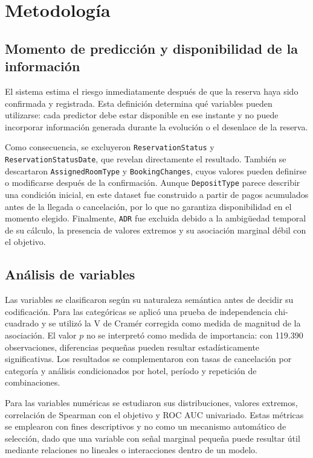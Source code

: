 \section{Metodología}

\subsection{Momento de predicción y disponibilidad de la información}

El sistema estima el riesgo inmediatamente después de que la reserva haya
sido confirmada y registrada. Esta definición determina qué variables pueden
utilizarse: cada predictor debe estar disponible en ese instante y no puede
incorporar información generada durante la evolución o el desenlace de la
reserva.

Como consecuencia, se excluyeron \texttt{ReservationStatus} y
\texttt{ReservationStatusDate}, que revelan directamente el resultado. También
se descartaron \texttt{AssignedRoomType} y \texttt{BookingChanges}, cuyos
valores pueden definirse o modificarse después de la confirmación. Aunque
\texttt{DepositType} parece describir una condición inicial, en este dataset
fue construido a partir de pagos acumulados antes de la llegada o cancelación,
por lo que no garantiza disponibilidad en el momento elegido. Finalmente,
\texttt{ADR} fue excluida debido a la ambigüedad temporal de su cálculo, la
presencia de valores extremos y su asociación marginal débil con el objetivo.

\subsection{Análisis de variables}

Las variables se clasificaron según su naturaleza semántica antes de decidir
su codificación. Para las categóricas se aplicó una prueba de independencia
chi-cuadrado y se utilizó la V de Cramér corregida como medida de magnitud de
la asociación. El valor $p$ no se interpretó como medida de importancia: con
119.390 observaciones, diferencias pequeñas pueden resultar estadísticamente
significativas. Los resultados se complementaron con tasas de cancelación por
categoría y análisis condicionados por hotel, período y repetición de
combinaciones.

Para las variables numéricas se estudiaron sus distribuciones, valores
extremos, correlación de Spearman con el objetivo y ROC AUC univariado. Estas
métricas se emplearon con fines descriptivos y no como un mecanismo automático
de selección, dado que una variable con señal marginal pequeña puede resultar
útil mediante relaciones no lineales o interacciones dentro de un modelo.

